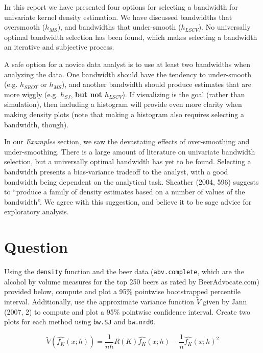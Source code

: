 \documentclass[]{article}
\begin{document}
In this report we have presented four options for selecting a bandwidth
for univariate kernel density estimation. We have discussed bandwidths
that oversmooth (\(h_{MS}\)), and bandwidths that under-smooth
(\(h_{LSCV}\)). No universally optimal bandwidth selection has been
found, which makes selecting a bandwidth an iterative and subjective
process.

A safe option for a novice data analyst is to use at least two
bandwidths when analyzing the data. One bandwidth should have the
tendency to under-smooth (e.g. \(h_{SROT}\) or \(h_{MS}\)), and another
bandwidth should produce estimates that are more wiggly (e.g.
\(h_{SJ}\), \textbf{but not \(h_{LSCV}\)}). If visualizing is the goal
(rather than simulation), then including a histogram will provide even
more clarity when making density plots (note that making a histogram
also requires selecting a bandwidth, though).

In our \emph{Examples} section, we saw the devastating effects of
over-smoothing and under-smoothing. There is a large amount of
literature on univariate bandwidth selection, but a universally optimal
bandwidth has yet to be found. Selecting a bandwidth presents a
bias-variance tradeoff to the analyst, with a good bandwidth being
dependent on the analytical task. Sheather (2004, 596) suggests to
``produce a family of density estimates based on a number of values of
the bandwidth''. We agree with this suggestion, and believe it to be
sage advice for exploratory analysis.

\section{Question}\label{question}

Using the \texttt{density} function and the beer data
(\texttt{abv.complete}, which are the alcohol by volume measures for the
top 250 beers as rated by BeerAdvocate.com) provided below, compute and
plot a 95\% pointwise bootstrapped percentile interval. Additionally,
use the approximate variance function \(\tilde{V}\) given by Jann (2007,
2) to compute and plot a 95\% pointwise confidence interval. Create two
plots for each method using \texttt{bw.SJ} and \texttt{bw.nrd0}.

\[\tilde{V}\left(\widehat{f_K}(x;h)\right) = \frac{1}{nh}R(K) \widehat{f_K}(x;h) - \frac{1}{n} \widehat{f_K}(x;h)^2\]
\end{document}

